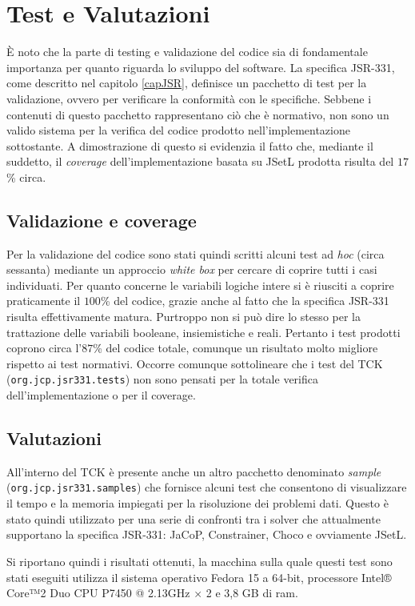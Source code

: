 \chapter{Test e Valutazioni}\label{test}
\`E noto che la parte di testing e validazione del codice sia di fondamentale
importanza per quanto riguarda lo sviluppo del software. La specifica JSR-331,
come descritto nel capitolo \ref{capJSR}, definisce un pacchetto di test per
la validazione, ovvero per verificare la conformità con le specifiche.
Sebbene i contenuti di questo pacchetto rappresentano ciò che è normativo, non
sono un valido sistema per la verifica del codice prodotto nell'implementazione
sottostante. A dimostrazione di questo si evidenzia il fatto che, mediante
il suddetto, il \emph{coverage} dell'implementazione basata su JSetL prodotta
risulta del $17$\% circa.

\section{Validazione e coverage}
Per la validazione del codice sono stati quindi
scritti alcuni test ad \emph{hoc} (circa sessanta) mediante un approccio
\emph{white box} per cercare di coprire tutti i casi individuati. Per quanto
concerne le variabili logiche intere si è riusciti a coprire praticamente
il $100$\% del codice, grazie anche al fatto che la specifica JSR-331
risulta effettivamente matura. Purtroppo non si può dire lo stesso per la
trattazione delle variabili booleane, insiemistiche e reali. Pertanto i
test prodotti coprono circa l'$87$\% del codice totale, comunque un risultato
molto migliore rispetto ai test normativi. Occorre comunque sottolineare che i
test del TCK (\texttt{org.jcp.jsr331.tests}) non sono pensati per la totale
verifica
dell'implementazione o per il coverage.

\section{Valutazioni}
All'interno del TCK è presente anche un altro pacchetto denominato \emph{sample}
(\texttt{org.jcp.jsr331.samples}) che fornisce alcuni test che consentono di
visualizzare
il tempo e la memoria impiegati per la risoluzione dei problemi dati.
Questo è stato quindi utilizzato per una serie di confronti tra i solver che
attualmente supportano la specifica JSR-331: JaCoP, Constrainer, Choco e
ovviamente JSetL.

Si riportano quindi i risultati ottenuti, la macchina sulla quale questi
test sono stati eseguiti utilizza il sistema operativo Fedora 15 a 64-bit,
processore Intel® Core™2 Duo CPU P7450 @ 2.13GHz × 2 e 3,8 GB di ram.

